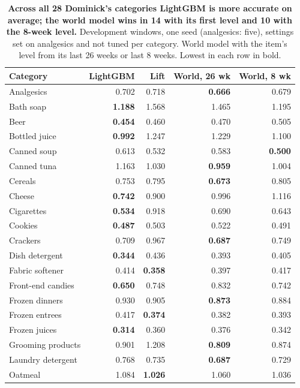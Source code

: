 \begin{table}[t]
\centering
\caption{\textbf{Across all 28 Dominick's categories LightGBM is more accurate on average; the world model
wins in 14 with its first level and 10 with the 8-week level.} Development windows, one seed (analgesics:
five), settings set on analgesics and not tuned per category. World model with the item's level from its
last 26 weeks or last 8 weeks. Lowest in each row in bold.}
\label{tab:dom28}
\footnotesize
\setlength{\tabcolsep}{4pt}
\renewcommand{\arraystretch}{1.05}
\begin{tabular}{lrrrr}
\toprule
\textbf{Category} & \textbf{LightGBM} & \textbf{Lift} & \textbf{World, 26 wk} & \textbf{World, 8 wk} \\
\midrule
Analgesics & 0.702 & 0.718 & \textbf{0.666} & 0.679 \\
Bath soap & \textbf{1.188} & 1.568 & 1.465 & 1.195 \\
Beer & \textbf{0.454} & 0.460 & 0.470 & 0.505 \\
Bottled juice & \textbf{0.992} & 1.247 & 1.229 & 1.100 \\
Canned soup & 0.613 & 0.532 & 0.583 & \textbf{0.500} \\
Canned tuna & 1.163 & 1.030 & \textbf{0.959} & 1.004 \\
Cereals & 0.753 & 0.795 & \textbf{0.673} & 0.805 \\
Cheese & \textbf{0.742} & 0.900 & 0.996 & 1.116 \\
Cigarettes & \textbf{0.534} & 0.918 & 0.690 & 0.643 \\
Cookies & \textbf{0.487} & 0.503 & 0.522 & 0.491 \\
Crackers & 0.709 & 0.967 & \textbf{0.687} & 0.749 \\
Dish detergent & \textbf{0.344} & 0.436 & 0.393 & 0.405 \\
Fabric softener & 0.414 & \textbf{0.358} & 0.397 & 0.417 \\
Front-end candies & \textbf{0.650} & 0.748 & 0.832 & 0.742 \\
Frozen dinners & 0.930 & 0.905 & \textbf{0.873} & 0.884 \\
Frozen entrees & 0.417 & \textbf{0.374} & 0.382 & 0.393 \\
Frozen juices & \textbf{0.314} & 0.360 & 0.376 & 0.342 \\
Grooming products & 0.901 & 1.208 & \textbf{0.809} & 0.874 \\
Laundry detergent & 0.768 & 0.735 & \textbf{0.687} & 0.729 \\
Oatmeal & 1.084 & \textbf{1.026} & 1.060 & 1.036 \\

\end{tabular}
\end{table}
